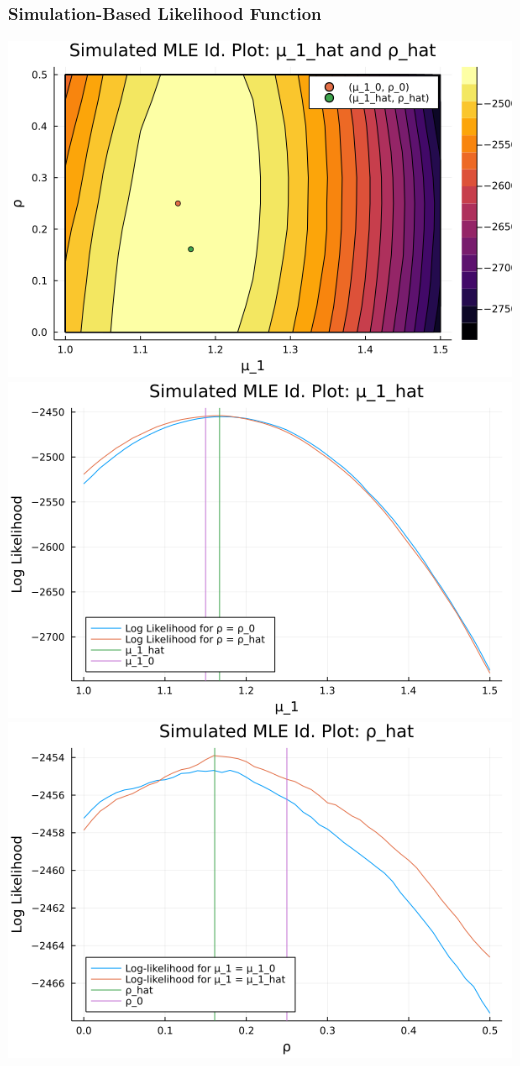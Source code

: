 \documentclass{article}
\begin{document}
\begin{enumerate}
\begin{enumerate}
\subsubsection*{Simulation-Based Likelihood Function}

\begin{center}
\includegraphics[scale =0.5]{q_f_3d_s}
\includegraphics[scale =0.5]{q_f_mu_1_s}
\includegraphics[scale =0.5]{q_f_rho_s}
\end{center}


\end{enumerate}
\end{enumerate}
\end{document}
